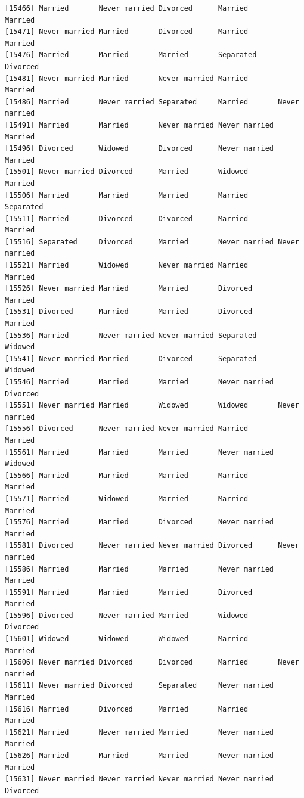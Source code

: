 \documentclass[
  letterpaper,
  DIV=11,
  numbers=noendperiod,
  oneside]{scrartcl}
\begin{document}
\begin{verbatim}
[15466] Married       Never married Divorced      Married       Married      
[15471] Never married Married       Divorced      Married       Married      
[15476] Married       Married       Married       Separated     Divorced     
[15481] Never married Married       Never married Married       Married      
[15486] Married       Never married Separated     Married       Never married
[15491] Married       Married       Never married Never married Married      
[15496] Divorced      Widowed       Divorced      Never married Married      
[15501] Never married Divorced      Married       Widowed       Married      
[15506] Married       Married       Married       Married       Separated    
[15511] Married       Divorced      Divorced      Married       Married      
[15516] Separated     Divorced      Married       Never married Never married
[15521] Married       Widowed       Never married Married       Married      
[15526] Never married Married       Married       Divorced      Married      
[15531] Divorced      Married       Married       Divorced      Married      
[15536] Married       Never married Never married Separated     Widowed      
[15541] Never married Married       Divorced      Separated     Widowed      
[15546] Married       Married       Married       Never married Divorced     
[15551] Never married Married       Widowed       Widowed       Never married
[15556] Divorced      Never married Never married Married       Married      
[15561] Married       Married       Married       Never married Widowed      
[15566] Married       Married       Married       Married       Married      
[15571] Married       Widowed       Married       Married       Married      
[15576] Married       Married       Divorced      Never married Married      
[15581] Divorced      Never married Never married Divorced      Never married
[15586] Married       Married       Married       Never married Married      
[15591] Married       Married       Married       Divorced      Married      
[15596] Divorced      Never married Married       Widowed       Divorced     
[15601] Widowed       Widowed       Widowed       Married       Married      
[15606] Never married Divorced      Divorced      Married       Never married
[15611] Never married Divorced      Separated     Never married Married      
[15616] Married       Divorced      Married       Married       Married      
[15621] Married       Never married Married       Never married Married      
[15626] Married       Married       Married       Never married Married      
[15631] Never married Never married Never married Never married Divorced     

\end{verbatim}
\end{document}
